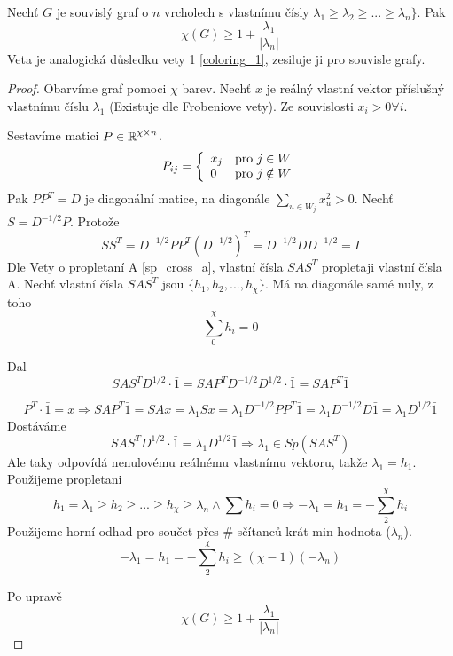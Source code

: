 \begin{theorem}
	Nechť $G$ je souvislý graf o $n$ vrcholech s vlastnímu čísly $\lambda_1 \geq \lambda_2 \geq ... \geq \lambda_n \}$. Pak
	\[ \chi(G) \geq 1 + \frac{\lambda_1}{|\lambda_n|} \]
	Veta je analogická důsledku vety 1 \cref{coloring_1}, zesiluje ji pro souvisle grafy.
\end{theorem}
\begin{proof}
	Obarvíme graf pomoci $\chi$ barev. Nechť $x$ je reálný vlastní vektor příslušný vlastnímu číslu $\lambda_1$ (Existuje dle Frobeniove vety).
	Ze souvislosti $x_i > 0 \forall i$.

	Sestavíme matici $P \in \operatorname{\mathbb{R}}^{\chi \times n}$.
	\[ P_{ij} = \left\{ \begin{array}{ll}  x_j & \mbox{pro } j \in W \\ 0 & \mbox{pro } j \notin W \end{array} \right. \]
	Pak $PP^T = D$ je diagonální matice, na diagonále $\sum_{u \in W_j}x_u^2 > 0$.
	Nechť $S = D^{-1/2}P$.
	Protože
	\[SS^T = D^{-1/2}PP^T(D^{-1/2})^T = D^{-1/2}DD^{-1/2} = I\]
	Dle Vety o propletaní A \cref{sp_cross_a}, vlastní čísla $SAS^T$ propletaji vlastní čísla A.
	Nechť vlastní čísla $SAS^T$ jsou $\{h_1, h_2,..., h_{\chi} \}$. Má na diagonále samé nuly, z toho %
	\[ \sum_0^{\chi} h_i = 0 \]

	Dal
	\[ SAS^{T}D^{1/2} \cdot \bar{1} = SAP^TD^{-1/2}D^{1/2} \cdot \bar{1} = SAP^T \bar{1} \]

	\[ P^T \cdot \bar{1} = x \Rightarrow SAP^T \bar{1} = SAx = \lambda_1 Sx = \lambda_1 D^{-1/2}PP^T \bar{1} = \lambda_1 D^{-1/2}D \bar{1} = \lambda_1 D^{1/2} \bar{1} \]
	Dostáváme
	\[ SAS^TD^{1/2} \cdot \bar{1} = \lambda_1 D^{1/2} \bar{1} \Rightarrow \lambda_1 \in Sp(SAS^T) \]
	Ale taky odpovídá nenulovému reálnému vlastnímu vektoru, takže $\lambda_1 = h_1$.
	Použijeme propletani
	\[ h_1 = \lambda_1 \geq h_2 \geq ... \geq h_{\chi} \geq \lambda_n \land \sum h_i = 0 \Rightarrow -\lambda_1 = h_1 = -\sum_2^{\chi} h_i \]
	Použijeme horní odhad pro součet přes \# sčítanců krát min hodnota ($\lambda_n$).
	\[ -\lambda_1 = h_1 = -\sum_2^{\chi} h_i \geq (\chi - 1)(-\lambda_n) \]

	Po upravě
	\[ \chi(G) \geq 1 + \frac{\lambda_1}{|\lambda_n|} \]
\end{proof}
